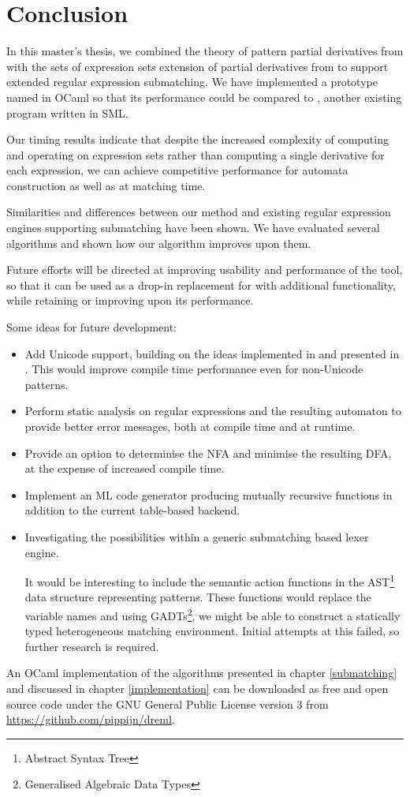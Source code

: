 \chapter{Conclusion}
\label{conclusion}

In this master's thesis, we combined the theory of pattern partial derivatives
from \cite{pdpat} with the sets of expression sets extension of partial
derivatives from \cite{pdere} to support extended regular expression
submatching. We have implemented a prototype named \dreml{} in OCaml so that its
performance could be compared to \mlulex, another existing program written in
SML.

Our timing results indicate that despite the increased complexity of computing
and operating on expression sets rather than computing a single derivative for
each expression, we can achieve competitive performance for automata
construction as well as at matching time.

Similarities and differences between our method and existing regular expression
engines supporting submatching have been shown. We have evaluated several
algorithms and shown how our algorithm improves upon them.

Future efforts will be directed at improving usability and performance of the
tool, so that it can be used as a drop-in replacement for \ocamllex{} with
additional functionality, while retaining or improving upon its performance.

Some ideas for future development:

\begin{itemize}

   \item Add Unicode support, building on the ideas implemented in \mlulex{} and
      presented in \cite{re-deriv}. This would improve compile time performance
      even for non-Unicode patterns.

   \item Perform static analysis on regular expressions and the resulting
      automaton to provide better error messages, both at compile time and at
      runtime.

   \item Provide an option to determinise the NFA and minimise the resulting
      DFA, at the expense of increased compile time.

   \item Implement an ML code generator producing mutually recursive functions
      in addition to the current table-based backend.

   \item Investigating the possibilities within a generic submatching based
      lexer engine.

      It would be interesting to include the semantic action functions in the
      AST\footnote{Abstract Syntax Tree} data structure representing patterns.
      These functions would replace the variable names and using
      GADTs\footnote{Generalised Algebraic Data Types}, we might be able to
      construct a statically typed heterogeneous matching environment. Initial
      attempts at this failed, so further research is required.

\end{itemize}

An OCaml implementation of the algorithms presented in chapter \ref{submatching}
and discussed in chapter \ref{implementation} can be downloaded as free and open
source code under the GNU General Public License version 3 from
\url{https://github.com/pippijn/dreml}.



